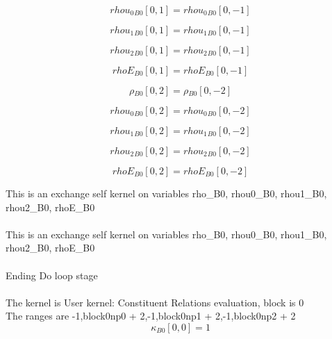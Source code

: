 \documentclass{article}
\begin{document}
\begin{dmath}{rhou_{0}{_{B0}}}[{0,1}] = {rhou_{0}{_{B0}}}[{0,-1}]\end{dmath}

\begin{dmath}{rhou_{1}{_{B0}}}[{0,1}] = {rhou_{1}{_{B0}}}[{0,-1}]\end{dmath}

\begin{dmath}{rhou_{2}{_{B0}}}[{0,1}] = {rhou_{2}{_{B0}}}[{0,-1}]\end{dmath}

\begin{dmath}{rhoE{_{B0}}}[{0,1}] = {rhoE{_{B0}}}[{0,-1}]\end{dmath}

\begin{dmath}{\rho{_{B0}}}[{0,2}] = {\rho{_{B0}}}[{0,-2}]\end{dmath}

\begin{dmath}{rhou_{0}{_{B0}}}[{0,2}] = {rhou_{0}{_{B0}}}[{0,-2}]\end{dmath}

\begin{dmath}{rhou_{1}{_{B0}}}[{0,2}] = {rhou_{1}{_{B0}}}[{0,-2}]\end{dmath}

\begin{dmath}{rhou_{2}{_{B0}}}[{0,2}] = {rhou_{2}{_{B0}}}[{0,-2}]\end{dmath}

\begin{dmath}{rhoE{_{B0}}}[{0,2}] = {rhoE{_{B0}}}[{0,-2}]\end{dmath}

\noindent This is an exchange self kernel on variables rho_B0, rhou0_B0, rhou1_B0, rhou2_B0, rhoE_B0\\\\\noindent This is an exchange self kernel on variables rho_B0, rhou0_B0, rhou1_B0, rhou2_B0, rhoE_B0\\\\\noindent Ending Do loop stage\\
\\\noindent The kernel is User kernel: Constituent Relations evaluation, block is 0\\\noindent The ranges are -1,block0np0 + 2,-1,block0np1 + 2,-1,block0np2 + 2\\\begin{dmath}{\kappa{_{B0}}}[{0,0}] = 1\end{dmath}
\end{document}
